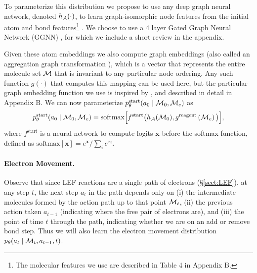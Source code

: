 To parameterize this distribution we propose to use any deep graph neural network, denoted $h_{{\mathcal{A}}}(\cdot)$, to learn graph-isomorphic node features from the initial atom and bond features\footnote{The molecular features we use are described in Table 4 in Appendix B.} \citep{duvenaud2015convolutional,kipf2016semi,li2016gated,gilmer2017neural}. We choose to use a 4 layer Gated Graph Neural Network (GGNN) \citep{li2016gated}, for which we include a short review in the appendix. %

Given these atom embeddings we also compute graph embeddings \citep[\S B.1]{li2018learning} (also called an aggregation graph transformation \citep[\S3]{Johnson2017-pd}), which is a vector that represents the entire molecule set ${\mathcal{M}}$ that is invariant to any particular node ordering. Any such function $g(\cdot)$ that computes this mapping can be used here, but the particular graph embedding function we use is inspired by \cite{li2018learning}, and described in detail in Appendix B. 
We can now parameterize $p_\theta^{\mathrm{start}}(a_0 \mid {\mathcal{M}}_0, {\mathcal{M}}_e)$ as
\begin{align}
p_\theta^{\mathrm{start}}(a_0 \mid  {\mathcal{M}}_0, {\mathcal{M}}_e) = \mbox{softmax}\Big[f^{\mathrm{start}}\big( h_{{\mathcal{A}}}({\mathcal{M}}_0), 
g^{\mathrm{reagent}}\left({\mathcal{M}}_e\right)\big)\Big], 
\end{align}
where $f^{\mathrm{start}}$ is a neural network to compute logits $\mathbf{x}$ before the softmax function, defined as $\mbox{softmax}[\mathbf{x}] = e^{\mathbf{x}}/\sum_{i} e^{x_i}$. %



\paragraph{Electron Movement.}
Observe that since LEF reactions are a single path of electrons (\S \ref{sect:LEF}), at any step $t$, the next step $a_t$ in the path depends only on (i) the intermediate molecules formed by the action path up to that point ${\mathcal{M}}_t$, (ii) the previous action taken $a_{t-1}$ (indicating where the free pair of electrons are), and (iii) the point of time $t$ through the path, indicating whether we are on an add or remove bond step. Thus we will also learn the electron movement distribution $p_\theta(a_t \mid {\mathcal{M}}_{t}, a_{t-1}, t)$.

